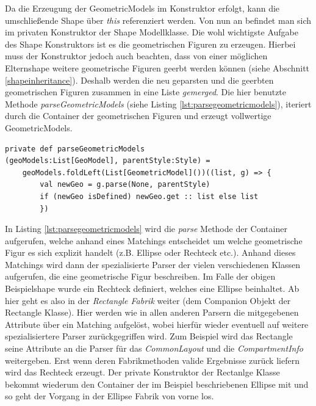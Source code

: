 Da die Erzeugung der GeometricModels im Konstruktor erfolgt, kann die umschließende Shape über \textit{this} referenziert werden. Von nun an befindet man sich im privaten Konstruktor der Shape Modellklasse. Die wohl wichtigste Aufgabe des Shape Konstruktors ist es die geometrischen Figuren zu erzeugen. Hierbei muss der Konstruktor jedoch auch beachten, dass von einer möglichen Elternshape weitere geometrische Figuren geerbt werden können (siehe Abschnitt \ref{shapeinheritance}). Deshalb werden die neu geparsten und die geerbten geometrischen Figuren zusammen in eine Liste \textit{gemerged}. Die hier benutzte Methode \textit{parseGeometricModels} (siehe Listing \ref{lst:parsegeometricmodels}), iteriert durch die Container der geometrischen Figuren und erzeugt vollwertige GeometricModels.
\begin{lstlisting}[style = scala, caption = {Auszug aus Code Methode parseGeometricModels}, label = {lst:parsegeometricmodels}]
private def parseGeometricModels
(geoModels:List[GeoModel], parentStyle:Style) =
    geoModels.foldLeft(List[GeometricModel]())((list, g) => {
    	val newGeo = g.parse(None, parentStyle)
    	if (newGeo isDefined) newGeo.get :: list else list
    	})
\end{lstlisting}In Listing \ref{lst:parsegeometricmodels} wird die \textit{parse} Methode der Container aufgerufen, welche anhand eines Matchings entscheidet um welche geometrische Figur es sich explizit handelt (z.B. Ellipse oder Rechteck etc.). Anhand dieses Matchings wird dann der spezialisierte Parser der vielen verschiedenen Klassen aufgerufen, die eine geometrische Figur beschreiben. Im Falle der obigen Beispielshape wurde ein Rechteck definiert, welches eine Ellipse beinhaltet. Ab hier geht es also in der \textit{Rectangle Fabrik} weiter (dem Companion Objekt der Rectangle Klasse). Hier werden wie in allen anderen Parsern die mitgegebenen Attribute über ein Matching aufgelöst, wobei hierfür wieder eventuell auf weitere spezialisiertere Parser zurückgegriffen wird. Zum Beispiel wird das Rectangle seine Attribute an die Parser für das \textit{CommonLayout} und die \textit{CompartmentInfo} weitergeben. Erst wenn deren Fabrikmethoden valide Ergebnisse zurück liefern wird das Rechteck erzeugt. Der private Konstruktor der Rectanlge Klasse bekommt wiederum den Container der im Beispiel beschriebenen Ellipse mit und so geht der Vorgang in der Ellipse Fabrik von vorne los. 
